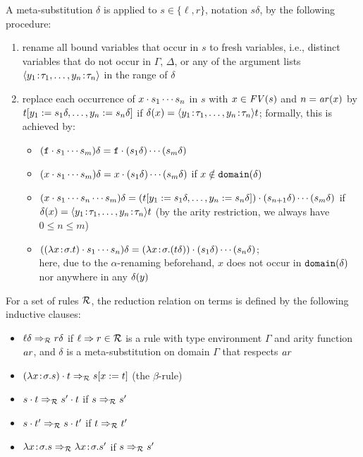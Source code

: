 A meta-substitution $\delta$ is applied to $s \in \{\ell,r\}$, notation $s\delta$, by the following
procedure:
\begin{enumerate}
\item rename all bound variables that occur in $s$ to fresh variables, i.e., distinct variables
  that do not occur in $\Gamma$, $\Delta$, or any of the argument lists $\metaabslist{\bvar}{
  \btype}{n}$ in the range of $\delta$
\item replace each occurrence of $x \cdot s_1 \cdots s_n$ in $s$ with $x \in \mathit{FV}(s)$ and
  $n = \mathit{ar}(x)$ by $t[y_1:=s_1\delta,\dots,y_n:=s_n\delta]$ if
  $\delta(x) = \langle y_1\!:\!\tau_1,\dots,y_n\!:\!\tau_{n}\rangle t$; formally, this is achieved by:
  \begin{itemize}
  \item $(\mathtt{f} \cdot s_1 \cdots s_m)\delta = \mathtt{f} \cdot (s_1\delta) \cdots (s_m\delta)$
  \item $(x \cdot s_1 \cdots s_m)\delta = x \cdot (s_1\delta) \cdots (s_m\delta)$
    if $x \notin \mathtt{domain}(\delta)$
  \item $(x \cdot s_1 \cdots s_n \cdots s_m)\delta =
    (t[y_1:=s_1\delta,\dots,y_n:=s_n\delta]) \cdot (s_{n+1}\delta) \cdots (s_m\delta)$
    if $\delta(x) = \langle y_1\!:\!\tau_1,\dots,y_n\!:\!\tau_{n}\rangle t$ (by the arity restriction, we always
    have $0 \leq n \leq m$)
  \item $((\lambda x\!:\!\sigma.t) \cdot s_1 \cdots s_n)\delta =
    (\lambda x\!:\!\sigma.(t\delta)) \cdot (s_1\delta) \cdots (s_n\delta)$; \\
    here, due to the $\alpha$-renaming beforehand, $x$ does not occur in $\mathtt{domain}(\delta)$ nor
    anywhere in any $\delta(y)$
  \end{itemize}
\end{enumerate}

For a set of rules $\mathcal{R}$, the reduction relation on terms is defined by the following inductive
clauses:
\begin{itemize}
\item $\ell\delta \Rightarrow_{\mathcal{R}} r\delta$ if $\ell \Rightarrow r \in \mathcal{R}$ is a rule with type
  environment $\Gamma$ and arity function $\mathit{ar}$, and $\delta$ is a meta-substitution on domain
  $\Gamma$ that respects $\mathit{ar}$
\item $(\lambda x\!:\!\sigma.s) \cdot t \Rightarrow_{\mathcal{R}} s[x:=t]$ (the $\beta$-rule)
\item $s \cdot t \Rightarrow_{\mathcal{R}} s' \cdot t$ if $s \Rightarrow_{\mathcal{R}} s'$
\item $s \cdot t' \Rightarrow_{\mathcal{R}} s \cdot t'$ if $t \Rightarrow_{\mathcal{R}} t'$
\item $\lambda x\!:\!\sigma.s \Rightarrow_{\mathcal{R}} \lambda x\!:\!\sigma.s'$ if $s \Rightarrow_{\mathcal{R}} s'$
\end{itemize}

